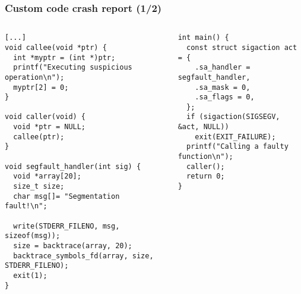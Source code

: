 \begin{frame}[fragile]
  \frametitle{Custom code crash report (1/2)}
  \begin{columns}
    \begin{block}{}
      \begin{verbatim}
[...]
void callee(void *ptr) {
  int *myptr = (int *)ptr;
  printf("Executing suspicious operation\n");
  myptr[2] = 0;
}

void caller(void) {
  void *ptr = NULL;
  callee(ptr);
}

void segfault_handler(int sig) {
  void *array[20];
  size_t size;
  char msg[]= "Segmentation fault!\n";

  write(STDERR_FILENO, msg, sizeof(msg));
  size = backtrace(array, 20);
  backtrace_symbols_fd(array, size, STDERR_FILENO);
  exit(1);
}
      \end{verbatim}
    \end{block}
    \begin{block}{}
      \begin{verbatim}
int main() {
  const struct sigaction act = {
    .sa_handler = segfault_handler,
    .sa_mask = 0,
    .sa_flags = 0,
  };
  if (sigaction(SIGSEGV, &act, NULL))
    exit(EXIT_FAILURE);
  printf("Calling a faulty function\n");
  caller();
  return 0;
}
      \end{verbatim}
    \end{block}
  \end{columns}
\end{frame}

